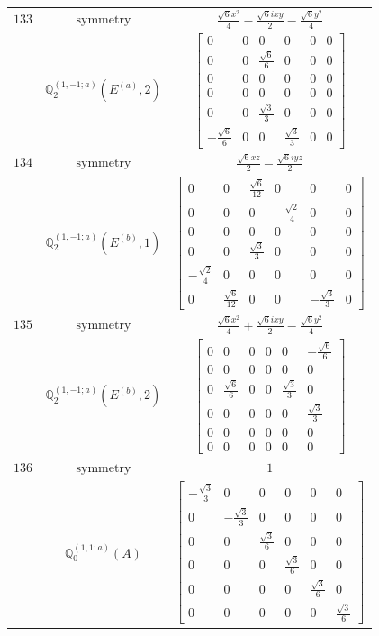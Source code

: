 \documentclass[fleqn,8pt,landscape]{jsarticle}
\begin{document}
\begin{longtable}{ccc}
$ 133 $ & $ \text{symmetry} $ & $ \frac{\sqrt{6} x^{2}}{4} - \frac{\sqrt{6} i x y}{2} - \frac{\sqrt{6} y^{2}}{4} $ \\
$  $ & $ \mathbb{Q}_{2}^{(1,-1;a)}(E^{(a)},2) $ & $ \begin{bmatrix} 0 & 0 & 0 & 0 & 0 & 0 \\ 0 & 0 & \frac{\sqrt{6}}{6} & 0 & 0 & 0 \\ 0 & 0 & 0 & 0 & 0 & 0 \\ 0 & 0 & 0 & 0 & 0 & 0 \\ 0 & 0 & \frac{\sqrt{3}}{3} & 0 & 0 & 0 \\ - \frac{\sqrt{6}}{6} & 0 & 0 & \frac{\sqrt{3}}{3} & 0 & 0 \end{bmatrix} $ \\ \hline
$ 134 $ & $ \text{symmetry} $ & $ \frac{\sqrt{6} x z}{2} - \frac{\sqrt{6} i y z}{2} $ \\
$  $ & $ \mathbb{Q}_{2}^{(1,-1;a)}(E^{(b)},1) $ & $ \begin{bmatrix} 0 & 0 & \frac{\sqrt{6}}{12} & 0 & 0 & 0 \\ 0 & 0 & 0 & - \frac{\sqrt{2}}{4} & 0 & 0 \\ 0 & 0 & 0 & 0 & 0 & 0 \\ 0 & 0 & \frac{\sqrt{3}}{3} & 0 & 0 & 0 \\ - \frac{\sqrt{2}}{4} & 0 & 0 & 0 & 0 & 0 \\ 0 & \frac{\sqrt{6}}{12} & 0 & 0 & - \frac{\sqrt{3}}{3} & 0 \end{bmatrix} $ \\ \hline
$ 135 $ & $ \text{symmetry} $ & $ \frac{\sqrt{6} x^{2}}{4} + \frac{\sqrt{6} i x y}{2} - \frac{\sqrt{6} y^{2}}{4} $ \\
$  $ & $ \mathbb{Q}_{2}^{(1,-1;a)}(E^{(b)},2) $ & $ \begin{bmatrix} 0 & 0 & 0 & 0 & 0 & - \frac{\sqrt{6}}{6} \\ 0 & 0 & 0 & 0 & 0 & 0 \\ 0 & \frac{\sqrt{6}}{6} & 0 & 0 & \frac{\sqrt{3}}{3} & 0 \\ 0 & 0 & 0 & 0 & 0 & \frac{\sqrt{3}}{3} \\ 0 & 0 & 0 & 0 & 0 & 0 \\ 0 & 0 & 0 & 0 & 0 & 0 \end{bmatrix} $ \\ \hline
$ 136 $ & $ \text{symmetry} $ & $ 1 $ \\
$  $ & $ \mathbb{Q}_{0}^{(1,1;a)}(A) $ & $ \begin{bmatrix} - \frac{\sqrt{3}}{3} & 0 & 0 & 0 & 0 & 0 \\ 0 & - \frac{\sqrt{3}}{3} & 0 & 0 & 0 & 0 \\ 0 & 0 & \frac{\sqrt{3}}{6} & 0 & 0 & 0 \\ 0 & 0 & 0 & \frac{\sqrt{3}}{6} & 0 & 0 \\ 0 & 0 & 0 & 0 & \frac{\sqrt{3}}{6} & 0 \\ 0 & 0 & 0 & 0 & 0 & \frac{\sqrt{3}}{6} \end{bmatrix} $ \\ \hline

\end{longtable}
\end{document}
